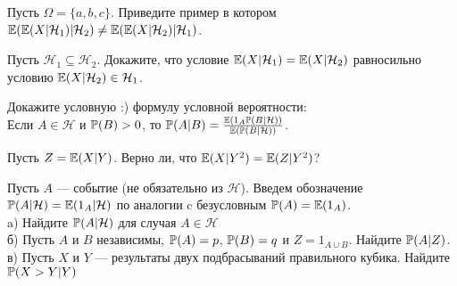 \begin{problem}
Пусть $\Omega=\{a,b,c\}$. Приведите пример в котором
$\E(\E(X|\mathcal{H}_{1})|\mathcal{H}_{2})\neq
\E(\E(X|\mathcal{H}_{2})|\mathcal{H}_{1})$.

\begin{sol}

\end{sol}
\end{problem}

\begin{problem}
Пусть $\mathcal{H}_{1} \subseteq \mathcal{H}_{2}$. Докажите, что
условие $\E(X|\mathcal{H}_{1})=\E(X|\mathcal{H}_{2})$ равносильно
условию $\E(X|\mathcal{H}_{2})\in \mathcal{H}_{1}$.

\begin{sol}

\end{sol}
\end{problem}

\begin{problem}
Докажите условную :) формулу условной вероятности: \\
Если $A\in \mathcal{H}$ и $\P(B)>0$, то
$\P(A|B)=\frac{\E(1_{A}\P(B|\mathcal{H}))}{\E(\P(B|\mathcal{H}))}$.

\begin{sol}

\end{sol}
\end{problem}

\begin{problem}
Пусть $Z=\E(X|Y)$. Верно ли, что $\E(X|Y^{2})=\E(Z|Y^{2})$?

\begin{sol}

\end{sol}
\end{problem}

\begin{problem}
Пусть $A$ — событие (не обязательно из $\mathcal{H}$). Введем
обозначение $\P(A|\mathcal{H})=\E(1_A|\mathcal{H})$ по аналогии
c безусловным $\P(A)=\E(1_{A})$. \\
a) Найдите $\P(A|\mathcal{H})$ для случая $A\in\mathcal{H}$ \\
б) Пусть $A$ и $B$ независимы, $\P(A)=p$, $\P(B)=q$ и $Z=1_{A\cup B}$. Найдите $\P(A|Z)$. \\
в) Пусть $X$ и $Y$ — результаты двух подбрасываний правильного
кубика. Найдите $\P(X>Y|Y)$

\begin{sol}

\end{sol}
\end{problem}

